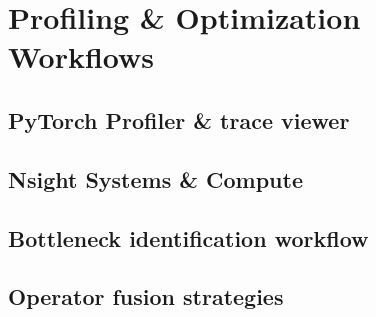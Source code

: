 
\section{Profiling \& Optimization Workflows}

\subsection{PyTorch Profiler \& trace viewer}


\subsection{Nsight Systems \& Compute}


\subsection{Bottleneck identification workflow}


\subsection{Operator fusion strategies}


